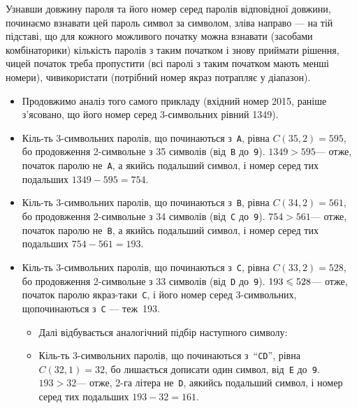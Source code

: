 \documentclass[14pt,a4paper]{extarticle}
\begin{document}
Узнавши довжину пароля та його номер серед паролів 
відповідної довжини, починаємо взнавати цей пароль символ за символом, зліва направо --- на тій підставі, що для кожного можливого початку можна взнавати (засобами комбінаторики) 
кількість паролів з таким початком і знову приймати рішення, чи\nolinebreak[3] цей початок треба пропустити (всі паролі з таким початком мають менші номери), чи\nolinebreak[3] використати (потрібний номер якраз потрапляє у діапазон).

\begin{small}
\begin{itemize}[leftmargin=*,itemsep=0pt,partopsep=0pt,topsep=0pt,parsep=0pt]
\item[] Продовжимо аналіз того самого прикладу (вхідний номер 2015, раніше з’ясовано, що його номер серед 3-символьних рівний 1349).

\item Кіль-ть 3-символьних паролів, що починаються з~\texttt{A}, рівна ${C(35,2) = 595}$, бо продовження %
2-символьне з 35 символів (від~\texttt{B} до~\texttt{9}). ${1349>595}$\nolinebreak[3] --- отже, початок паролю не~\texttt{A}, а якийсь подальший символ, і номер %
серед тих подальших ${1349-595=754}$.

\item Кіль-ть 3-символьних паролів, що починаються з~\texttt{B}, рівна ${C(34,2) = 561}$, бо продовження %
2-символьне з 34 символів (від~\texttt{C} до~\texttt{9}). ${754>561}$\nolinebreak[3] --- отже, початок паролю не~\texttt{B}, а якийсь подальший символ, і номер %
серед тих подальших ${754-561=193}$.

\item Кіль-ть 3-символьних паролів, що починаються з~\texttt{C}, рівна ${C(33,2) = 528}$, бо продовження %
2-символьне з 33 символів (від~\texttt{D} до~\texttt{9}). ${193\leqslant528}$\nolinebreak[3] --- отже, початок паролю якраз-таки~\texttt{C}, і його номер серед 3-символьних, що\nolinebreak[3] починаються з~\texttt{C} --- теж~193.

\begin{itemize}[leftmargin=*,itemsep=0pt,partopsep=0pt,topsep=0pt,parsep=0pt]
\item[] Далі відбувається аналогічний підбір наступного символу:

\item[\textopenbullet] Кіль-ть 3-символьних паролів, що починаються з~``\texttt{CD}'', рівна ${C(32,1)=32}$, бо лишається дописати один символ, від~\texttt{E} до~\texttt{9}. ${193>32}$\nolinebreak[3] --- отже, 2-га літера не~\texttt{D}, а\nolinebreak[3] якийсь подальший символ, і номер %
серед тих подальших ${193-32=161}$.


\end{itemize}
\end{itemize}
\end{small}
\end{document}
